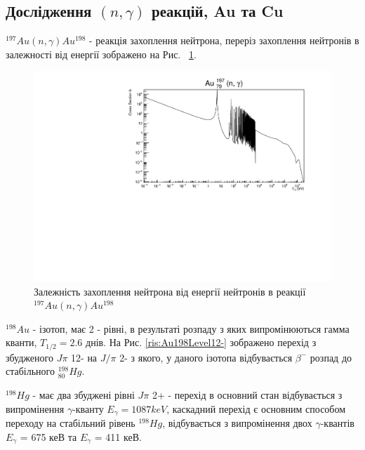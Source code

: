 \documentclass[a4paper, 14pt]{article}
\numberwithin{equation}{section}
\numberwithin{table}{section}
\begin{document}
\subsection{Дослідження $(n, \gamma)$ реакцій, Au та Cu} 
$^{197}Au(n,\gamma)Au^{198}$ - реакція захоплення нейтрона, переріз захоплення нейтронів в залежності від енергії зображено на Рис.~ \ref{ris:AuSigma}.
\begin{figure}[hbt!]
	\centering \includegraphics[width=1\textwidth]{sigma/Au197Sigma.pdf}
	\caption{Залежність захоплення нейтрона від енергії нейтронів в реакції  $^{197}Au(n,\gamma)Au^{198}$} 
	\label{ris:AuSigma}	
\end{figure} 

$^{198}Au $ - ізотоп, має 2 - рівні, в результаті розпаду з яких випромінюються гамма кванти, $T_{1/2} = 2.6$ днів. На Рис. \ref{ris:Au198Level12-} зображено перехід з збудженого $J\pi$ 12- на $J/\pi$ 2- з якого, у даного ізотопа відбувається $\beta^-$ розпад до стабільного $^{198}_{80}Hg$.

$^{198}Hg$ - має два збуджені рівні $J\pi$ 2+ - перехід в основний стан відбувається з випромінення $\gamma$-кванту $E_\gamma=1087keV$, каскадний перехід є основним способом переходу на стабільний рівень $^{198}Hg$, відбувається з випромінення двох $\gamma$-квантів $E_\gamma$ = 675 кеВ та $E_\gamma$ = 411 кеВ. 
\end{document}
